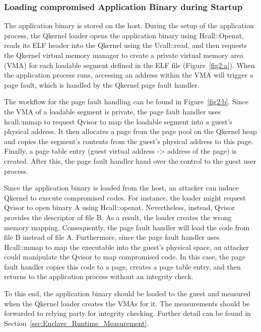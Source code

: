 \subsubsection{Loading compromised Application Binary during Startup}
\label{sec:app_binary_loading}
The application binary is stored on the host. During the setup of the application process, the Qkernel loader opens the application binary using Hcall::Openat, reads its ELF header into the Qkernel using the Ucall::read, and then requests the Qkernel virtual memory manager to create a private virtual 
memory area (VMA) for each loadable segment defined in the ELF file (Figure~\ref{fig2:a}). When the application process runs, accessing an address within the VMA will trigger a page fault, which is handled by the Qkernel page fault handler.
 
The workflow for the page fault handling can be found in Figure~\ref{fig2:b}. Since the VMA of a loadable segment is private, the page fault handler uses hcall::mmap to request Qvisor to map the loadable segment into a guest's physical address. It then allocates a page from the page pool on the Qkernel heap and copies the 
segment's contents from the guest's physical address to this page. Finally, a page table entry (guest virtual address -> address of the page) is created. After this, the page fault handler hand over the control to the guest user process.
 
Since the application binary is loaded from the host,  an attacker can induce Qkernel to execute compromised codes. For instance, the loader might request Qvisor to open binary A using Hcall::openat. Nevertheless, instead, Qvisor provides the descriptor of file B. As a result, the loader creates the 
wrong memory mapping. Consequently, the page fault handler will load the code from file B instead of file A. Furthermore, since the page fault handler uses Hcall::mmap to map the executable into the guest's physical space, an attacker could manipulate the Qvisor to map compromised code. In this case, 
the page fault handler copies this code to a page, creates a page table entry, and then returns to the application process without an integrity check.  
 
To this end, the application binary should be loaded to the guest and measured when the Qkernel loader creates the VMAs for it. The measurements should be forwarded to relying party for integrity checking. Further detail can be found in Section~\ref{sec:Enclave_Runtime_Measurement}. 

